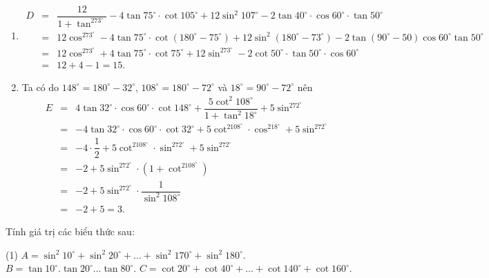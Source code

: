 \begin{bt}
{\begin{enumerate}
\begin{eqnarray*}
		&=&1+1+\left(\dfrac{\sqrt{2}}{2}\right)^2=2+\dfrac{1}{2}=\dfrac{5}{2}.
	\end{eqnarray*}
	\item 
	\allowdisplaybreaks
	\begin{eqnarray*}
		D&=& \dfrac{12}{1+\tan^273^\circ} -4\tan 75^\circ\cdot\cot 105^\circ+12\sin^2 107^\circ-2 \tan 40^\circ \cdot \cos 60^\circ \cdot \tan 50^\circ\\
		&=&12\cos^273^\circ-4\tan75^\circ\cdot\cot(180^\circ-75^\circ)+12\sin^2(180^\circ-73^\circ)-2\tan(90^\circ-50)\cos60^\circ\tan 50^\circ\\
		&=&12\cos^273^\circ+4\tan75^\circ\cdot\cot75^\circ+12\sin^273^\circ-2\cot 50^\circ\cdot \tan 50^\circ\cdot \cos 60^\circ\\
		&=&12+4-1=15.
	\end{eqnarray*}
	\item Ta có do $148^\circ=180^\circ-32^\circ$, $108^\circ=180^\circ-72^\circ$ và $18^\circ=90^\circ-72^\circ$ nên
	\allowdisplaybreaks
	\begin{eqnarray*}
		E&=&4 \tan 32^\circ \cdot \cos 60^\circ \cdot \cot 148^\circ+\dfrac{5 \cot^2 108^\circ}{1+\tan^2 18^\circ}+5\sin^272^\circ\\
		&=&-4 \tan 32^\circ \cdot \cos 60^\circ \cdot \cot 32^\circ+5\cot^2108^\circ\cdot\cos^218^\circ+5\sin^272^\circ\\
		&=&-4\cdot\dfrac{1}{2}+5\cot^2108^\circ\cdot\sin^272^\circ+5\sin^272^\circ\\
		&=&-2+5\sin^272^\circ\cdot\left(1+\cot^2108^\circ\right)\\
		&=&-2+5\sin^272^\circ\cdot \dfrac{1}{\sin^2 108^\circ}\\
		&=&-2+5=3.
	\end{eqnarray*}
\end{enumerate}	
}
\end{bt}
\begin{bt}%
	Tính giá trị các biểu thức sau:
	\begin{tasks}(1)
		\task $A=\sin^2 10^{\circ}+\sin^2 20^{\circ}+\dots+\sin^2 170^{\circ}+\sin^2 180^{\circ}$.
		\task $B=\tan 10^{\circ}.\tan 20^{\circ}\dots\tan 80^{\circ}$.
		\task $C=\cot 20^{\circ}+\cot 40^{\circ}+\dots +\cot 140^{\circ}+\cot160^{\circ}$.
	\end{tasks}
\end{bt}
